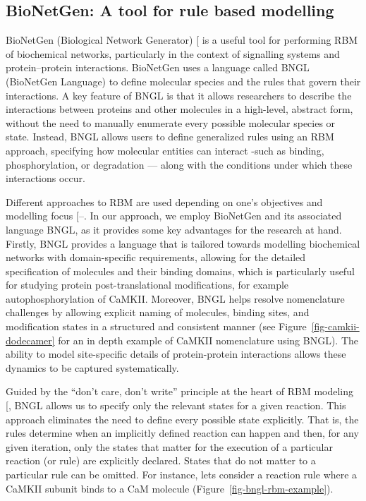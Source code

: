 \documentclass[
  11pt,
  letterpaper,
]{scrreprt}
\begin{document}
\subsection*{BioNetGen: A tool for rule based
modelling}\label{bionetgen-a-tool-for-rule-based-modelling}

BioNetGen (Biological Network Generator)
{[}\citeproc{ref-harris2016BioNetGena}{245}{]} is a useful tool for
performing RBM of biochemical networks, particularly in the context of
signalling systems and protein--protein interactions. BioNetGen uses a
language called BNGL (BioNetGen Language) to define molecular species
and the rules that govern their interactions. A key feature of BNGL is
that it allows researchers to describe the interactions between proteins
and other molecules in a high-level, abstract form, without the need to
manually enumerate every possible molecular species or state. Instead,
BNGL allows users to define generalized rules using an RBM approach,
specifying how molecular entities can interact -such as binding,
phosphorylation, or degradation --- along with the conditions under
which these interactions occur.

Different approaches to RBM are used depending on one's objectives and
modelling focus
{[}--\citeproc{ref-boutillier2018Kappa}{293}{]}.
In our approach, we employ BioNetGen and its associated language BNGL,
as it provides some key advantages for the research at hand. Firstly,
BNGL provides a language that is tailored towards modelling biochemical
networks with domain-specific requirements, allowing for the detailed
specification of molecules and their binding domains, which is
particularly useful for studying protein post-translational
modifications, for example autophosphorylation of CaMKII. Moreover, BNGL
helps resolve nomenclature challenges by allowing explicit naming of
molecules, binding sites, and modification states in a structured and
consistent manner (see Figure~\ref{fig-camkii-dodecamer} for an in depth
example of CaMKII nomenclature using BNGL). The ability to model
site-specific details of protein-protein interactions allows these
dynamics to be captured systematically.

Guided by the ``don't care, don't write'' principle at the heart of RBM
modeling {[}\citeproc{ref-chylek2014Rulebased}{288}{]}, BNGL allows us
to specify only the relevant states for a given reaction. This approach
eliminates the need to define every possible state explicitly. That is,
the rules determine when an implicitly defined reaction can happen and
then, for any given iteration, only the states that matter for the
execution of a particular reaction (or rule) are explicitly declared.
States that do not matter to a particular rule can be omitted. For
instance, lets consider a reaction rule where a CaMKII subunit binds to
a CaM molecule (Figure~\ref{fig-bngl-rbm-example}).
\end{document}
